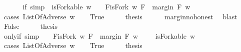 \begin{isabellebody}
\ \ %
\endisadelimproof
%
\isatagproof
{}\isamarkupfalse%
%
\endisatagproof
{\isafoldproof}%
%
\isadelimproof
\isanewline
%
\endisadelimproof
\ \ \isanewline
{}\isamarkupfalse%
\ if{\isacharunderscore}{}{\isacharunderscore}{}{}\ {\isacharbrackleft}simp{\isacharbrackright}{\isacharcolon}\ \ {\isachardoublequoteopen}isForkable\ w{\isachardoublequoteclose}\ \ \ {\isachardoublequoteopen}{\isacharparenleft}{\isasymexists}\ F{\isachardot}{\isacharparenleft}isFork\ w\ F\ {\isasymand}\ margin\ F\ w\ {\isasymge}\ {}{\isacharparenright}{\isacharparenright}{\isachardoublequoteclose}\isanewline
%
\isadelimproof
%
\endisadelimproof
%
\isatagproof
{}\isamarkupfalse%
\ {\isacharparenleft}cases\ {\isachardoublequoteopen}ListOfAdverse\ w{\isachardoublequoteclose}{\isacharparenright}\isanewline
\ \ \isamarkupfalse%
\ True\isanewline
\ \ \isamarkupfalse%
\ \isamarkupfalse%
\ {\isacharquery}thesis\isanewline
\ \ \ \ \isamarkupfalse%
\ margin{\isacharunderscore}no{\isacharunderscore}honest\ \isamarkupfalse%
\ blast\ \isanewline
{}\isamarkupfalse%
\isanewline
\ \ \isamarkupfalse%
\ False\isanewline
\ \ \isamarkupfalse%
\ \isamarkupfalse%
\ {\isacharquery}thesis\ \isamarkupfalse%
\isanewline
{}\isamarkupfalse%
%
\endisatagproof
{\isafoldproof}%
%
\isadelimproof
\isanewline
%
\endisadelimproof
\ \ \ \isanewline
{}\isamarkupfalse%
\ only{\isacharunderscore}if{\isacharunderscore}{}{\isacharunderscore}{}{}\ {\isacharbrackleft}simp{\isacharbrackright}{\isacharcolon}\ \ \ {\isachardoublequoteopen}{\isacharparenleft}{\isasymexists}\ F{\isachardot}{\isacharparenleft}isFork\ w\ F\ {\isasymand}\ margin\ F\ w\ {\isasymge}\ {}{\isacharparenright}{\isacharparenright}{\isachardoublequoteclose}\ \ {\isachardoublequoteopen}\ isForkable\ w{\isachardoublequoteclose}\isanewline
%
\isadelimproof
%
\endisadelimproof
%
\isatagproof
{}\isamarkupfalse%
\ {\isacharparenleft}cases\ {\isachardoublequoteopen}ListOfAdverse\ w{\isachardoublequoteclose}{\isacharparenright}\isanewline
\ \ \isamarkupfalse%
\ True\isanewline
\ \ \isamarkupfalse%
\ \isamarkupfalse%
\ {\isacharquery}thesis\isanewline
\ \ \ \ \isamarkupfalse%

\end{isabellebody}

